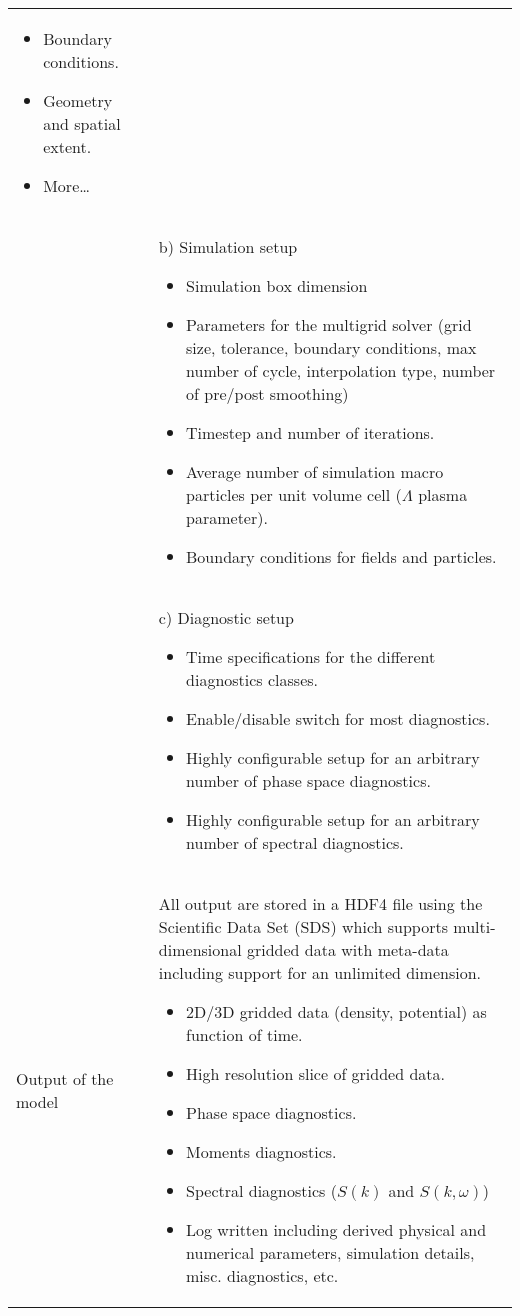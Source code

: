 \documentclass[10pt,a4paper]{article}
\begin{document}
\begin{table}[ht]
\begin{footnotesize}
\begin{tabularx}{\textwidth}{|X|X|}
\begin{itemize}
\begin{itemize}
each direction.
\item Boundary conditions.
\item Geometry and spatial extent.
\item More\ldots
\end{itemize}
\end{itemize}
\\
 & b)  Simulation setup
\begin{itemize}
\item Simulation box dimension
\item Parameters for the multigrid solver (grid size, tolerance, boundary
conditions, max number of cycle, interpolation type, number of pre/post
smoothing)
\item Timestep and number of iterations.
\item Average number of simulation macro particles per unit volume cell
($\Lambda$ plasma parameter).
\item Boundary conditions for fields and particles.
\end{itemize}
\\
 & c)  Diagnostic setup
\begin{itemize}
\item Time specifications for the different diagnostics classes.
\item Enable/disable switch for most diagnostics.
\item Highly configurable setup for an arbitrary number of phase space
diagnostics.
\item Highly configurable setup for an arbitrary number of spectral
diagnostics.
\end{itemize}\\
\hline
Output of the model                     &
All output are stored in a HDF4 file using the Scientific Data Set (SDS)
which supports multi-dimensional gridded data with meta-data including
support
for an unlimited dimension.
\begin{itemize}
\item 2D/3D gridded data (density, potential) as function of time.
\item High resolution slice of gridded data.
\item Phase space diagnostics.
\item Moments diagnostics.
\item Spectral diagnostics ($S(k)$ and $S(k,\omega)$)
\item Log written including derived physical and numerical parameters,
simulation details, misc. diagnostics, etc.
\end{itemize}
\\
\hline
\end{tabularx}
\end{footnotesize}
\end{table}
\end{document}
